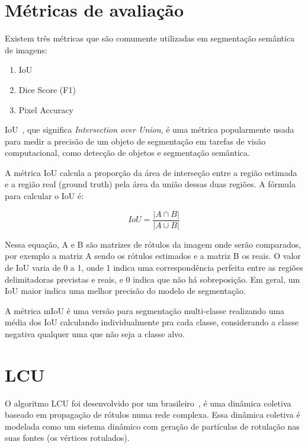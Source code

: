 \section{Métricas de avaliação}

Existem três métricas que são comumente utilizadas em segmentação
semântica de imagens:

\begin{enumerate}
\item IoU
\item Dice Score (F1)
\item Pixel Accuracy
\end{enumerate}

IoU~\cite{rezatofighi2019generalized}, que significa
\textit{Intersection over Union}, é uma métrica popularmente usada
para medir a precisão de um objeto de segmentação em tarefas de visão
computacional, como detecção de objetos e segmentação semântica.

A métrica IoU calcula a proporção da área de interseção entre a região
estimada e a região real (ground truth) pela área da união dessas duas
regiões. A fórmula para calcular o IoU é:

\begin{equation}
  IoU = \dfrac{\left| A \cap B \right|}{\left| A \cup B \right|}
\end{equation}


Nessa equação, A e B são matrizes de rótulos da imagem onde serão
comparados, por exemplo a matriz A sendo os rótulos estimados e a
matriz B os reais. O valor de IoU varia de 0 a 1, onde 1 indica uma
correspondência perfeita entre as regiões delimitadoras previstas e
reais, e 0 indica que não há sobreposição. Em geral, um IoU maior
indica uma melhor precisão do modelo de segmentação.

A métrica mIoU é uma versão para segmentação multi-classe realizando
uma média dos IoU calculando individualmente pra cada classe,
considerando a classe negativa qualquer uma que não seja a classe alvo.

\section{LCU}\label{sec:teorica-lcu}

O algoritmo \gls{LCU} foi desenvolvido por um
brasileiro~\cite{VerriNetworkUnfoldingMap2018}, é uma dinâmica
coletiva baseado em propagação de rótulos numa rede complexa. Essa
dinâmica coletiva é modelada como um sistema dinâmico com geração de
partículas de rotulação nas suas fontes (os vértices rotulados).

